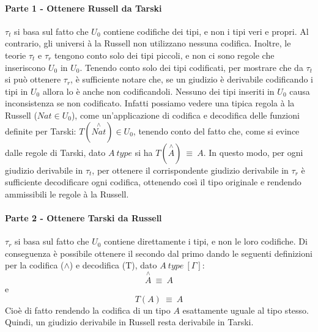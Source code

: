 \paragraph{Parte 1 - Ottenere Russell da Tarski}
$\tau_t$ si basa sul fatto che $U_0$ contiene codifiche dei tipi, e non i tipi veri e propri. Al contrario, gli universi à la Russell non utilizzano nessuna codifica. Inoltre, le teorie $\tau_t$ e $\tau_r$ tengono conto solo dei tipi piccoli, e non ci sono regole che inseriscono $U_0$ in $U_0$. Tenendo conto solo dei tipi codificati, per mostrare che da $\tau_t$ si può ottenere $\tau_r$, è sufficiente notare che, se un giudizio è derivabile codificando i tipi in $U_0$ allora lo è anche non codificandoli. Nessuno dei tipi inseriti in $U_0$ causa inconsistenza se non codificato. Infatti possiamo vedere una tipica regola à la Russell ($Nat\in U_0$), come un'applicazione di codifica e decodifica delle funzioni definite per Tarski: $T(\stackrel{\wedge}{Nat})\in U_0$, tenendo conto del fatto che, come si evince dalle regole di Tarski, dato $A~type$ si ha $T(\stackrel{\wedge}{A})~\equiv~A$. In questo modo, per ogni giudizio derivabile in $\tau_t$, per ottenere il corrispondente giudizio derivabile in $\tau_r$ è sufficiente decodificare ogni codifica, ottenendo così il tipo originale e rendendo ammissibili le regole à la Russell.

\paragraph{Parte 2 - Ottenere Tarski da Russell}
$\tau_r$ si basa sul fatto che $U_0$ contiene direttamente i tipi, e non le loro codifiche. Di conseguenza è possibile ottenere il secondo dal primo dando le seguenti definizioni per la codifica ($\wedge$) e decodifica (T), dato $A~type~[\Gamma]$:
\[\stackrel{\wedge}{A}~\equiv~A\] e 
\[T(A)~\equiv~A\]
Cioè di fatto rendendo la codifica di un tipo $A$ esattamente uguale al tipo stesso. Quindi, un giudizio derivabile in Russell resta derivabile in Tarski.